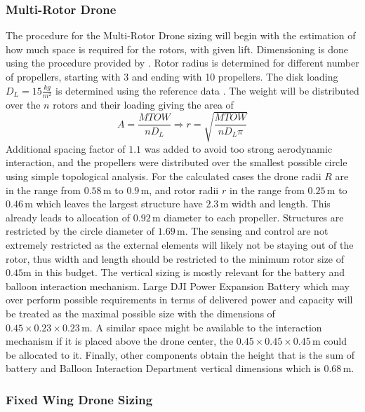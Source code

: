 \subsubsection{Multi-Rotor Drone}
The procedure for the Multi-Rotor Drone sizing will begin with the estimation of how much space is required for the rotors, with given lift. Dimensioning is done using the procedure provided by \cite{Yang2024SizingRange}. Rotor radius is determined for different number of propellers, starting with 3 and ending with 10 propellers. The disk loading $D_L=15 \frac{kg}{m^2}$ is determined using the reference data \cite{DJI2025DJIT100} \cite{DJIDJI}. The weight will be distributed over the $n$ rotors and their loading giving the area of 
\begin{equation}
    A=\frac{MTOW}{nD_L} \Rightarrow r=\sqrt{\frac{MTOW}{nD_L\pi}}
\end{equation}
Additional spacing factor of $1.1$ was added to avoid too strong aerodynamic interaction, and the propellers were distributed over the smallest possible circle using simple topological analysis. For the calculated cases the drone radii $R$ are in the range from $0.58 \, \text{m}$ to $0.9 \,\text{m}$, and rotor radii $r$ in the range from $0.25 \, \text{m}$ to $0.46 \, \text{m}$ which leaves the largest structure have $2.3 \, \text{m}$ width and length. This already leads to allocation of $0.92 \, \text{m}$ diameter to each propeller. Structures are restricted by the circle diameter of $1.69 \, \text{m}$. The sensing and control are not extremely restricted as the external elements will likely not be staying out of the rotor, thus width and length should be restricted to the minimum rotor size of $0.45 \text{m}$ in this budget. The vertical sizing is mostly relevant for the battery and balloon interaction mechanism. Large DJI Power Expansion Battery \cite{DJI2026DJI2000} which may over perform possible requirements in terms of delivered power and capacity will be treated as the maximal possible size with the dimensions of $0.45\times0.23\times0.23 \, \text{m}$. A similar space might be available to the interaction mechanism if it is placed above the drone center, the $0.45\times0.45\times0.45 \, \text{m}$ could be allocated to it. Finally, other components obtain the height that is the sum of battery and Balloon Interaction Department vertical dimensions which is $0.68 \, \text{m}$.
\vspace{-10pt}
\subsubsection{Fixed Wing Drone Sizing}


